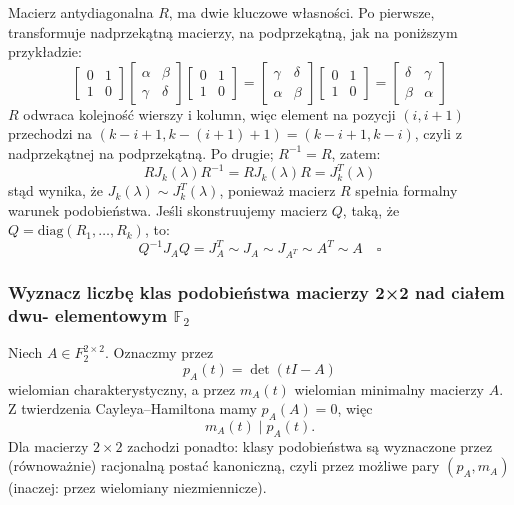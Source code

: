 \documentclass{../notatki}
\begin{document}
Macierz antydiagonalna $R$, ma dwie kluczowe własności. Po pierwsze,
transformuje nadprzekątną macierzy, na podprzekątną, jak na poniższym
przykładzie:
$$
\begin{bmatrix}
  0 & 1 \\
  1 & 0
\end{bmatrix}
\begin{bmatrix}
  \alpha & \beta \\
  \gamma & \delta
\end{bmatrix}
\begin{bmatrix}
  0 & 1 \\
  1 & 0
\end{bmatrix}
=
\begin{bmatrix}
  \gamma & \delta \\
  \alpha & \beta
\end{bmatrix}
\begin{bmatrix}
  0 & 1 \\
  1 & 0
\end{bmatrix}
=
\begin{bmatrix}
  \delta & \gamma \\
  \beta & \alpha
\end{bmatrix}
$$
$R$ odwraca kolejność wierszy i kolumn, więc element na pozycji
$(i,i+1)$ przechodzi na $(k-i+1, k-(i+1)+1)=(k-i+1, k-i)$, czyli z
nadprzekątnej na podprzekątną.
Po drugie; $R^{-1} = R$, zatem:
$$
RJ_k(\lambda)R^{-1} = RJ_k(\lambda)R = J_k^T(\lambda)
$$
stąd wynika, że $J_k(\lambda) \sim J_k^T(\lambda)$, ponieważ macierz $R$
spełnia formalny warunek podobieństwa. Jeśli skonstruujemy macierz $Q$,
taką, że $Q = \textrm{diag}(R_1, \dots, R_k)$, to:
$$
Q^{-1} J_A Q = J_A^T \sim J_A \sim J_{A^T} \sim A^T \sim A \quad \square
$$

\subsubsection{Wyznacz liczbę klas podobieństwa macierzy 2×2 nad ciałem dwu-
elementowym \texorpdfstring{$\mathbb{F}_2$}{F\_2}}

Niech $A \in F_2^{2 \times 2}$. Oznaczmy przez
$$
p_A(t) = \det(tI-A)
$$
wielomian charakterystyczny, a przez $m_A(t)$ wielomian minimalny macierzy $A$.
Z twierdzenia Cayleya--Hamiltona mamy $p_A(A)=0$, więc
$$
m_A(t)\mid p_A(t).
$$
Dla macierzy $2\times 2$ zachodzi ponadto: klasy podobieństwa są wyznaczone
przez (równoważnie) racjonalną postać kanoniczną, czyli przez możliwe pary
$(p_A,m_A)$ (inaczej: przez wielomiany niezmiennicze).
\end{document}

